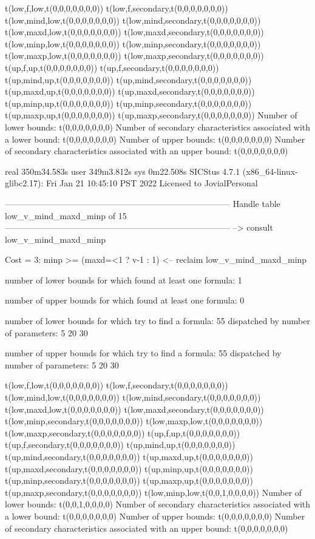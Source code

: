 t(low,f,low,t(0,0,0,0,0,0,0))
t(low,f,secondary,t(0,0,0,0,0,0,0))
t(low,mind,low,t(0,0,0,0,0,0,0))
t(low,mind,secondary,t(0,0,0,0,0,0,0))
t(low,maxd,low,t(0,0,0,0,0,0,0))
t(low,maxd,secondary,t(0,0,0,0,0,0,0))
t(low,minp,low,t(0,0,0,0,0,0,0))
t(low,minp,secondary,t(0,0,0,0,0,0,0))
t(low,maxp,low,t(0,0,0,0,0,0,0))
t(low,maxp,secondary,t(0,0,0,0,0,0,0))
t(up,f,up,t(0,0,0,0,0,0,0))
t(up,f,secondary,t(0,0,0,0,0,0,0))
t(up,mind,up,t(0,0,0,0,0,0,0))
t(up,mind,secondary,t(0,0,0,0,0,0,0))
t(up,maxd,up,t(0,0,0,0,0,0,0))
t(up,maxd,secondary,t(0,0,0,0,0,0,0))
t(up,minp,up,t(0,0,0,0,0,0,0))
t(up,minp,secondary,t(0,0,0,0,0,0,0))
t(up,maxp,up,t(0,0,0,0,0,0,0))
t(up,maxp,secondary,t(0,0,0,0,0,0,0))
Number of lower bounds:                                             t(0,0,0,0,0,0,0)
Number of secondary characteristics associated with a lower bound:  t(0,0,0,0,0,0,0)
Number of upper bounds:                                             t(0,0,0,0,0,0,0)
Number of secondary characteristics associated with an upper bound: t(0,0,0,0,0,0,0)

real	350m34.583s
user	349m3.812s
sys	0m22.508s
SICStus 4.7.1 (x86_64-linux-glibc2.17): Fri Jan 21 10:45:10 PST 2022
Licensed to JovialPersonal


--------------------------------------------------------------------------------
Handle table low_v_mind_maxd_minp of 15
--------------------------------------------------------------------------------
--> consult low_v_mind_maxd_minp

Cost =  3:  minp >= (maxd=<1 ? v-1 : 1)
<-- reclaim low_v_mind_maxd_minp

number of lower bounds for which found at least one formula: 1

number of upper bounds for which found at least one formula: 0

number of lower bounds for which try to find a formula: 55
dispatched by number of parameters: 5  20  30

number of upper bounds for which try to find a formula: 55
dispatched by number of parameters: 5  20  30

t(low,f,low,t(0,0,0,0,0,0,0))
t(low,f,secondary,t(0,0,0,0,0,0,0))
t(low,mind,low,t(0,0,0,0,0,0,0))
t(low,mind,secondary,t(0,0,0,0,0,0,0))
t(low,maxd,low,t(0,0,0,0,0,0,0))
t(low,maxd,secondary,t(0,0,0,0,0,0,0))
t(low,minp,secondary,t(0,0,0,0,0,0,0))
t(low,maxp,low,t(0,0,0,0,0,0,0))
t(low,maxp,secondary,t(0,0,0,0,0,0,0))
t(up,f,up,t(0,0,0,0,0,0,0))
t(up,f,secondary,t(0,0,0,0,0,0,0))
t(up,mind,up,t(0,0,0,0,0,0,0))
t(up,mind,secondary,t(0,0,0,0,0,0,0))
t(up,maxd,up,t(0,0,0,0,0,0,0))
t(up,maxd,secondary,t(0,0,0,0,0,0,0))
t(up,minp,up,t(0,0,0,0,0,0,0))
t(up,minp,secondary,t(0,0,0,0,0,0,0))
t(up,maxp,up,t(0,0,0,0,0,0,0))
t(up,maxp,secondary,t(0,0,0,0,0,0,0))
t(low,minp,low,t(0,0,1,0,0,0,0))
Number of lower bounds:                                             t(0,0,1,0,0,0,0)
Number of secondary characteristics associated with a lower bound:  t(0,0,0,0,0,0,0)
Number of upper bounds:                                             t(0,0,0,0,0,0,0)
Number of secondary characteristics associated with an upper bound: t(0,0,0,0,0,0,0)


